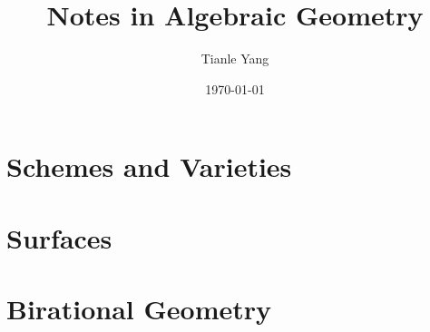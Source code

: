 \documentclass[sectionlevel=book]{noteformyself}
\title{Notes in Algebraic Geometry}
\author{Tianle Yang}
\date{\today}
\begin{document}
    \maketitle

    \frontmatter

    \tableofcontents

    \mainmatter

    \chapter{Schemes and Varieties}
        \setcounter{section}{-1}
        
        
        
        
        
        
        
        


    \chapter{Surfaces}
        
        
        
        
        
        
        

        
    \chapter{Birational Geometry}
        
        
        
\end{document}
